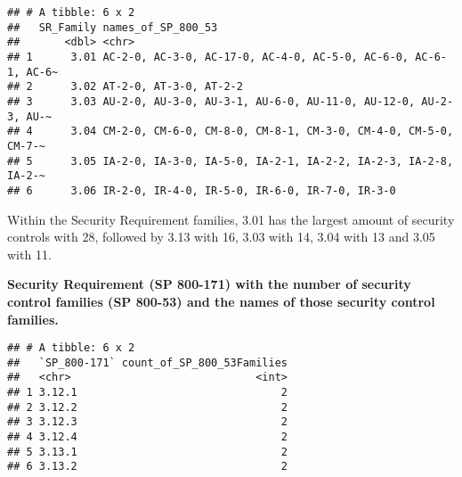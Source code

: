 \documentclass[]{article}
\newenvironment{Shaded}{\begin{snugshade}}{\end{snugshade}}
\newcommand{\KeywordTok}[1]{\textcolor[rgb]{0.13,0.29,0.53}{\textbf{#1}}}
\newcommand{\DataTypeTok}[1]{\textcolor[rgb]{0.13,0.29,0.53}{#1}}
\newcommand{\StringTok}[1]{\textcolor[rgb]{0.31,0.60,0.02}{#1}}
\newcommand{\OperatorTok}[1]{\textcolor[rgb]{0.81,0.36,0.00}{\textbf{#1}}}
\newcommand{\NormalTok}[1]{#1}
\begin{document}
\begin{verbatim}
## # A tibble: 6 x 2
##   SR_Family names_of_SP_800_53                                            
##       <dbl> <chr>                                                         
## 1      3.01 AC-2-0, AC-3-0, AC-17-0, AC-4-0, AC-5-0, AC-6-0, AC-6-1, AC-6~
## 2      3.02 AT-2-0, AT-3-0, AT-2-2                                        
## 3      3.03 AU-2-0, AU-3-0, AU-3-1, AU-6-0, AU-11-0, AU-12-0, AU-2-3, AU-~
## 4      3.04 CM-2-0, CM-6-0, CM-8-0, CM-8-1, CM-3-0, CM-4-0, CM-5-0, CM-7-~
## 5      3.05 IA-2-0, IA-3-0, IA-5-0, IA-2-1, IA-2-2, IA-2-3, IA-2-8, IA-2-~
## 6      3.06 IR-2-0, IR-4-0, IR-5-0, IR-6-0, IR-7-0, IR-3-0
\end{verbatim}

Within the Security Requirement families, 3.01 has the largest amount of
security controls with 28, followed by 3.13 with 16, 3.03 with 14, 3.04
with 13 and 3.05 with 11.

\textbf{Security Requirement (SP 800-171) with the number of security
control families (SP 800-53) and the names of those security control
families.}

\begin{Shaded}
\end{Shaded}

\begin{verbatim}
## # A tibble: 6 x 2
##   `SP_800-171` count_of_SP_800_53Families
##   <chr>                             <int>
## 1 3.12.1                                2
## 2 3.12.2                                2
## 3 3.12.3                                2
## 4 3.12.4                                2
## 5 3.13.1                                2
## 6 3.13.2                                2
\end{verbatim}
\end{document}
